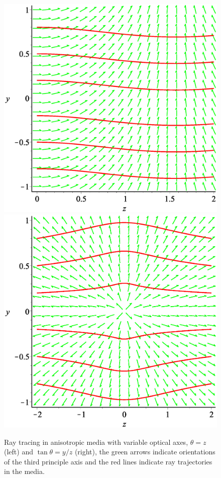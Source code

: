 \documentclass[9pt,twocolumn,twoside]{osajnl}
\begin{document}
\begin{figure}[htbp]
\centering
\includegraphics[scale=0.2]{Visualization2}
\includegraphics[scale=0.2]{Visualization1}
\caption{Ray tracing in anisotropic media with variable optical axes, $\theta=z$ (left) and $\tan{\theta}=y/z$ (right),  the  green arrows  indicate orientations of the third principle axis and the red lines  indicate ray trajectories  in the media.}
\label{curvedspace2}
\end{figure}
\end{document}
